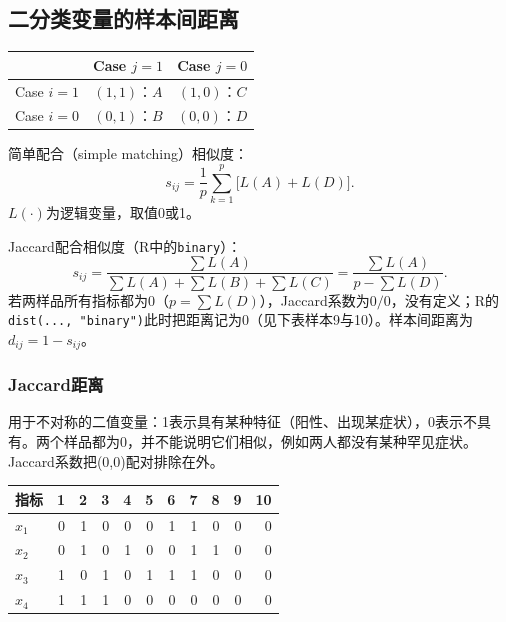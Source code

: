 \subsection{二分类变量的样本间距离}
\begin{center}\begin{tabular}{c@{\qquad}cc}\toprule
&{\bfseries Case $j=1$}&{\bfseries Case $j=0$}\\\midrule
Case $i=1$&$(1,1)$：$A$&$(1,0)$：$C$\\
Case $i=0$&$(0,1)$：$B$&$(0,0)$：$D$\\\bottomrule
\end{tabular}\end{center}
简单配合（simple matching）相似度：
\begin{equation}
s_{ij}=\frac1p\sum_{k=1}^p\bigl[L(A)+L(D)\bigr].
\end{equation}
$L(\cdot)$为逻辑变量，取值0或1。

Jaccard配合相似度（R中的\texttt{binary}）：
\begin{equation}
s_{ij}=\frac{\sum L(A)}{\sum L(A)+\sum L(B)+\sum L(C)}
=\frac{\sum L(A)}{p-\sum L(D)}.
\end{equation}
若两样品所有指标都为0（$p=\sum L(D)$），Jaccard系数为$0/0$，没有定义；R的\texttt{dist(..., "binary")}此时把距离记为0（见下表样本9与10）。样本间距离为$d_{ij}=1-s_{ij}$。
\subsubsection{Jaccard距离}
用于不对称的二值变量：1表示具有某种特征（阳性、出现某症状），0表示不具有。两个样品都为0，并不能说明它们相似，例如两人都没有某种罕见症状。Jaccard系数把(0,0)配对排除在外。
\par\addvspace{5pt}\begin{center}\begin{minipage}{\linewidth}\centering
\small
{}
\begin{tabular}{lrrrrrrrrrr}\toprule
{\bfseries 指标 }&{\bfseries  1 }&{\bfseries  2 }&{\bfseries  3 }&{\bfseries  4 }&{\bfseries  5 }&{\bfseries  6 }&{\bfseries  7 }&{\bfseries  8 }&{\bfseries  9 }&{\bfseries  10}\\\midrule
$x_1$ & 0 & 1 & 0 & 0 & 0 & 1 & 1 & 0 & 0 & 0\\
$x_2$ & 0 & 1 & 0 & 1 & 0 & 0 & 1 & 1 & 0 & 0\\
$x_3$ & 1 & 0 & 1 & 0 & 1 & 1 & 1 & 0 & 0 & 0\\
$x_4$ & 1 & 1 & 1 & 0 & 0 & 0 & 0 & 0 & 0 & 0\\
\bottomrule\end{tabular}
\end{minipage}\end{center}

